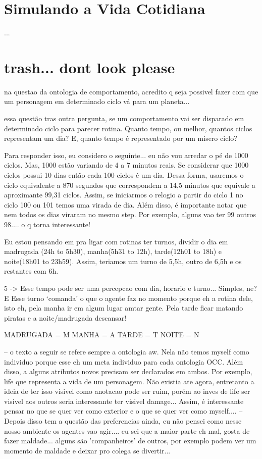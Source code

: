 \section{Simulando a Vida Cotidiana} \label{ch:cdu:svc}

...



\section{trash... dont look please}
na questao da ontologia de comportamento, acredito q seja possivel
fazer com que um personagem em determinado ciclo vá para um
planeta...

essa questão tras outra pergunta, se um comportamento vai ser
disparado em determinado ciclo para parecer rotina. Quanto tempo,
ou melhor, quantos ciclos representam um dia? E, quanto tempo
é representado por um misero ciclo?

Para responder isso, eu considero o seguinte... eu não vou arredar o
pé de 1000 ciclos. Mas, 1000 estão variando de 4 a 7 minutos reais.
Se considerar que 1000 ciclos possui 10 dias então cada 100 ciclos é um dia.
Dessa forma, usaremos o ciclo equivalente a 870 segundos que correspondem
a 14,5 minutos que equivale a aproximante 99,31 ciclos. Assim, se iniciarmos
o relogio a partir do ciclo 1 no ciclo 100 ou 101 temos uma virada de dia.
Além disso, é importante notar que nem todos os dias viraram no mesmo step.
Por exemplo, alguns vao ter 99 outros 98.... o q torna interessante!

Eu estou pensando em pra ligar com rotinas ter turnos, dividir o dia em
madrugada (24h to 5h30), manha(5h31 to 12h), tarde(12h01 to 18h) e
noite(18h01 to 23h59). Assim, teriamos um turno de 5,5h, outro de 6,5h e os
restantes com 6h.

5 -> Esse tempo pode ser uma percepcao com dia, horario e turno... Simples,
ne?
       E Esse turno `comanda' o que o agente faz no momento porque eh a rotina
       dele, isto eh, pela manha ir em algum lugar amtar gente. Pela tarde
ficar
       matando piratas e a noite/madrugada descansar!

MADRUGADA = M
MANHA = A
TARDE = T
NOITE = N

--
o texto a seguir se refere sempre a ontologia aw.
Nela não temos myself como individuo porque esse
eh um meta individuo para cada ontologia OCC.
Além disso, a alguns atributos novos precisam ser
declarados em ambos. Por exemplo, life que representa
a vida de um personagem. Não existia ate agora,
entretanto a ideia de ter isso visivel como anotacao
pode ser ruim, porém ao inves de life ser visivel aos
outros seria interessante ter visivel damage...
Assim, é interessante pensar no que se quer ver
como exterior e o que se quer ver como myself....
--
Depois disso tem a questão das preferencias ainda,
eu não pensei como nesse nosso ambiente os agentes
vao agir.... eu sei que a maior parte eh mal, gosta de
fazer maldade... alguns são 'companheiros' de outros,
por exemplo podem ver um momento de maldade e
deixar pro colega se divertir...

